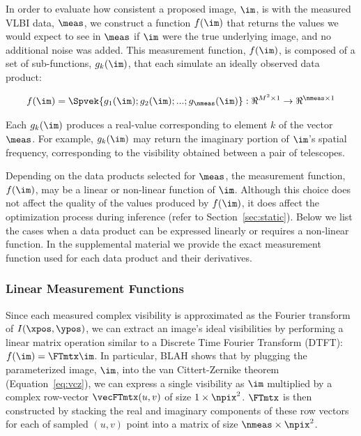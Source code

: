 In order to evaluate how consistent a proposed image, $\im$, is with the measured VLBI data, $\meas$, we construct a function $f(\im)$ that returns the values we would expect to see in $\meas$ if $\im$ were the true underlying image, and no additional noise was added. This measurement function, $f(\im)$, is composed of a set of sub-functions, $g_k(\im)$, that each simulate an ideally observed data product: 

\begin{align}
f(\im) = \Spvek{g_1(\im); g_2(\im); ...; g_{\nmeas}(\im)} : \Re^{ M^2 \times 1} \rightarrow \Re^{ \nmeas \times 1 }
\end{align}

Each $g_k(\im)$ produces a real-value corresponding to element $k$ of the vector $\meas$. For example, $g_k(\im)$ may return the imaginary portion of $\im$'s spatial frequency, corresponding to the visibility obtained between a pair of telescopes.

Depending on the data products selected for $\meas$, the measurement function, $f(\im)$, may be a linear or non-linear function of $\im$. Although this choice does not affect the quality of the values produced by $f(\im)$, it does affect the optimization process during inference (refer to Section~\ref{sec:static}). %
Below we list the cases when a data product can be expressed linearly or requires a non-linear function. In the supplemental material we provide the exact measurement function used for each data product and their derivatives. 

\vspace{.1in}
\subsubsection{Linear Measurement Functions}
\label{sec:dataproducts_lin}
Since each measured complex visibility is approximated as the Fourier transform of $I(\xpos,\ypos)$, we can extract an image's ideal visibilities by performing a linear matrix operation similar to a Discrete Time Fourier Transform (DTFT): $f(\im) = \FTmtx \im$.
In particular, BLAH shows that by plugging the parameterized image, $\im$, into the van Cittert-Zernike theorem (Equation~\ref{eq:vcz}), we can express a single visibility as $\im$ multiplied by a complex row-vector $\vecFTmtx(u,v)$ of size $1 \times \npix^2$.  $\FTmtx$ is then constructed by stacking the real and imaginary components of these row vectors for each of sampled $(u,v)$ point into a matrix of size $\nmeas \times \npix^2$. 


